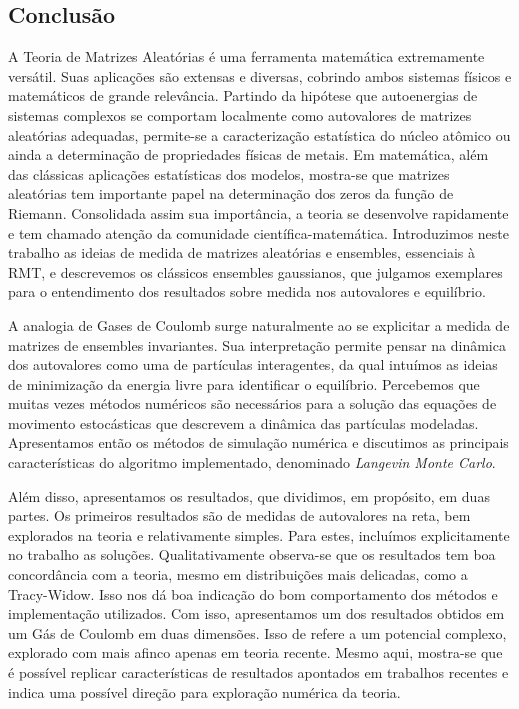 \documentclass[12pt]{report}
\begin{document}
\subsection{Conclusão}

A Teoria de Matrizes Aleatórias é uma ferramenta matemática extremamente versátil. Suas aplicações são extensas e diversas, cobrindo ambos sistemas físicos e matemáticos de grande relevância. Partindo da hipótese que autoenergias de sistemas complexos se comportam localmente como autovalores de matrizes aleatórias adequadas, permite-se a caracterização estatística do núcleo atômico ou ainda a determinação de propriedades físicas de metais. Em matemática, além das clássicas aplicações estatísticas dos modelos, mostra-se que matrizes aleatórias tem importante papel na determinação dos zeros da função de Riemann. Consolidada assim sua importância, a teoria se desenvolve rapidamente e tem chamado atenção da comunidade científica-matemática. Introduzimos neste trabalho as ideias de medida de matrizes aleatórias e ensembles, essenciais à RMT, e descrevemos os clássicos ensembles gaussianos, que julgamos exemplares para o entendimento dos resultados sobre medida nos autovalores e equilíbrio.

A analogia de Gases de Coulomb surge naturalmente ao se explicitar a medida de matrizes de ensembles invariantes. Sua interpretação permite pensar na dinâmica dos autovalores como uma de partículas interagentes, da qual intuímos as ideias de minimização da energia livre para identificar o equilíbrio. Percebemos que muitas vezes métodos numéricos são necessários para a solução das equações de movimento estocásticas que descrevem a dinâmica das partículas modeladas. Apresentamos então os métodos de simulação numérica e discutimos as principais características do algoritmo implementado, denominado \textit{Langevin Monte Carlo}.

Além disso, apresentamos os resultados, que dividimos, em propósito, em duas partes. Os primeiros resultados são de medidas de autovalores na reta, bem explorados na teoria e relativamente simples. Para estes, incluímos explicitamente no trabalho as soluções. Qualitativamente observa-se que os resultados tem boa concordância com a teoria, mesmo em distribuições mais delicadas, como a Tracy-Widow. Isso nos dá boa indicação do bom comportamento dos métodos e implementação utilizados. Com isso, apresentamos um dos resultados obtidos em um Gás de Coulomb em duas dimensões. Isso de refere a um potencial complexo, explorado com mais afinco apenas em teoria recente. Mesmo aqui, mostra-se que é possível replicar características de resultados apontados em trabalhos recentes e indica uma possível direção para exploração numérica da teoria.
\end{document}
